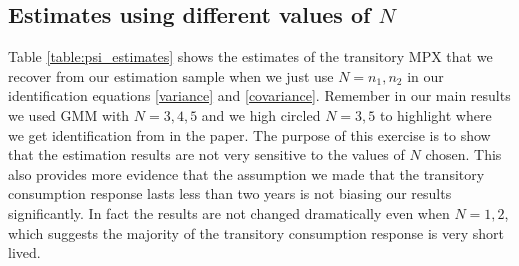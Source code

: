 \documentclass[titlepage]{\econtex}\newcommand{\texname}{ConsumptionHeterogeneity}
\begin{document}
\subsection{Estimates using different values of $N$}
\begin{center}
	\label{table:psi_estimates}
	
\end{center}
Table \ref{table:psi_estimates} shows the estimates of the transitory MPX that we recover from our estimation sample when we just use $N=n_1,n_2$ in our identification equations \ref{variance} and \ref{covariance}. Remember in our main results we used GMM with $N=3,4,5$ and we high circled $N=3,5$ to highlight where we get identification from in the paper. The purpose of this exercise is to show that the estimation results are not very sensitive to the values of $N$ chosen. This also provides more evidence that the assumption we made that the transitory consumption response lasts less than two years is not biasing our results significantly. In fact the results are not changed dramatically even when $N=1,2$, which suggests the majority of the transitory consumption response is very short lived.
\end{document}
